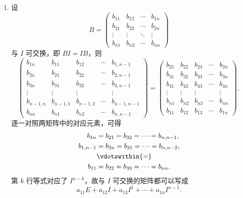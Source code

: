 \documentclass[12pt,fontset=fandol]{ctexart}
\begin{document}
\begin{solve}
\begin{enumerate}
                \item 设 
\[B = \begin{pmatrix}
                        b_{11} & b_{12} & \cdots & b_{1n} \\
                        b_{21} & b_{22} & \cdots & b_{2n} \\
                        \vdots & \vdots & \ddots & \vdots \\
                        b_{n1} & b_{n2} & \cdots & b_{nn}
                    \end{pmatrix}\]
 与 $I$ 可交换，即 $BI=IB$，则
                    \[
                        \begin{pmatrix}
                            b_{1n} & b_{11} & b_{12} & \cdots & b_{1,n-1} \\
                            b_{2n} & b_{21} & b_{22} & \cdots & b_{2,n-1} \\
                            b_{3n} & b_{31} & b_{32} & \cdots & b_{3,n-1} \\
                            \vdots & \vdots & \vdots &        & \vdots    \\
                            b_{n-1,n} & b_{n-1,1} & b_{n-1,2} & \cdots & b_{n-1,n-1} \\
                            b_{nn} & b_{n1} & b_{n2} & \cdots & b_{n,n-1}
                        \end{pmatrix} = \begin{pmatrix}
                            b_{21} & b_{22} & b_{23} & \cdots & b_{2n} \\
                            b_{31} & b_{32} & b_{33} & \cdots & b_{3n} \\
                            b_{41} & b_{42} & b_{43} & \cdots & b_{4n} \\
                            \vdots & \vdots & \vdots &        & \vdots \\
                            b_{n1} & b_{n2} & b_{n3} & \cdots & b_{nn} \\
                            b_{11} & b_{12} & b_{13} & \cdots & b_{1n}
                        \end{pmatrix},
                    \]
                    逐一对照两矩阵中的对应元素，可得
                    \begin{align*}
                        b_{1n} &= b_{21} = b_{32} = \cdots = b_{n,n-1}, \\
                        b_{1,n-1} &= b_{2n} = b_{31} = \cdots = b_{n,n-2}, \\
                        &\vdotswithin{=} \\
                        b_{11} &= b_{22} = b_{33} = \cdots = b_{nn}.
                    \end{align*}
                    第 $k$ 行等式对应了 $I^{n-k}$，故与 $I$ 可交换的矩阵都可以写成
                    \[
                        a_{11}E + a_{12}I + a_{13}I^2 + \cdots + a_{1n}I^{n-1}.
                    \]


\end{enumerate}
\end{solve}
\end{document}
